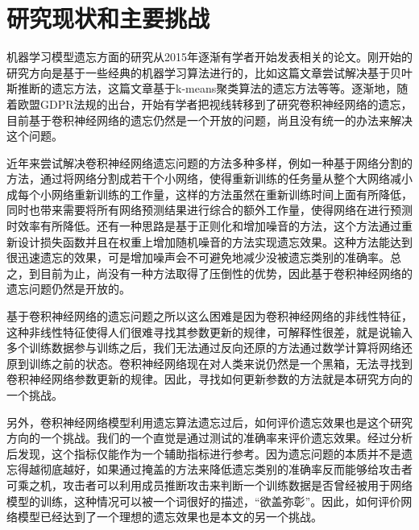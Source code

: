 \section{研究现状和主要挑战}
机器学习模型遗忘方面的研究从2015年逐渐有学者开始发表相关的论文。刚开始的研究方向是基于一些经典的机器学习算法进行的，比如这篇文章尝试解决基于贝叶斯推断的遗忘方法，这篇文章基于k-means聚类算法的遗忘方法等等。逐渐地，随着欧盟GDPR法规的出台，开始有学者把视线转移到了研究卷积神经网络的遗忘，目前基于卷积神经网络的遗忘仍然是一个开放的问题，尚且没有统一的办法来解决这个问题。

近年来尝试解决卷积神经网络遗忘问题的方法多种多样，例如一种基于网络分割的方法，通过将网络分割成若干个小网络，使得重新训练的任务量从整个大网络减小成每个小网络重新训练的工作量，这样的方法虽然在重新训练时间上面有所降低，同时也带来需要将所有网络预测结果进行综合的额外工作量，使得网络在进行预测时效率有所降低。还有一种思路是基于正则化和增加噪音的方法，这个方法通过重新设计损失函数并且在权重上增加随机噪音的方法实现遗忘效果。这种方法能达到很迅速遗忘的效果，可是增加噪声会不可避免地减少没被遗忘类别的准确率。总之，到目前为止，尚没有一种方法取得了压倒性的优势，因此基于卷积神经网络的遗忘问题仍然是开放的。

基于卷积神经网络的遗忘问题之所以这么困难是因为卷积神经网络的非线性特征，这种非线性特征使得人们很难寻找其参数更新的规律，可解释性很差，就是说输入多个训练数据参与训练之后，我们无法通过反向还原的方法通过数学计算将网络还原到训练之前的状态。卷积神经网络现在对人类来说仍然是一个黑箱，无法寻找到卷积神经网络参数更新的规律。因此，寻找如何更新参数的方法就是本研究方向的一个挑战。

另外，卷积神经网络模型利用遗忘算法遗忘过后，如何评价遗忘效果也是这个研究方向的一个挑战。我们的一个直觉是通过测试的准确率来评价遗忘效果。经过分析后发现，这个指标仅能作为一个辅助指标进行参考。因为遗忘问题的本质并不是遗忘得越彻底越好，如果通过掩盖的方法来降低遗忘类别的准确率反而能够给攻击者可乘之机，攻击者可以利用成员推断攻击来判断一个训练数据是否曾经被用于网络模型的训练，这种情况可以被一个词很好的描述，“欲盖弥彰”。因此，如何评价网络模型已经达到了一个理想的遗忘效果也是本文的另一个挑战。
